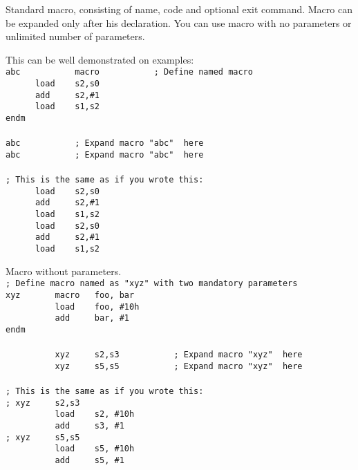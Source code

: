     Standard macro, consisting of name, code and optional exit command. Macro can be expanded only after his declaration. You can use macro with no parameters  or unlimited number of parameters.

    This can be well demonstrated on examples:\\
    {
        \usecodefont
        \verb'abc           macro           ; Define named macro '\\
        \verb'      load    s2,s0'\\
        \verb'      add     s2,#1'\\
        \verb'      load    s1,s2'\\
        \verb'endm'\\\\
        \verb'abc           ; Expand macro "abc"  here'\\
        \verb'abc           ; Expand macro "abc"  here'\\\\
        \verb'; This is the same as if you wrote this:'\\
        \verb'      load    s2,s0'\\
        \verb'      add     s2,#1'\\
        \verb'      load    s1,s2'\\
        \verb'      load    s2,s0'\\
        \verb'      add     s2,#1'\\
        \verb'      load    s1,s2'\\
    }

    Macro without parameters.\\
    {
        \usecodefont
        \verb'; Define macro named as "xyz" with two mandatory parameters'\\
        \verb'xyz       macro   foo, bar'\\
        \verb'          load    foo, #10h'\\
        \verb'          add     bar, #1'\\
        \verb'endm'\\\\
        \verb'          xyz     s2,s3           ; Expand macro "xyz"  here'\\
        \verb'          xyz     s5,s5           ; Expand macro "xyz"  here'\\\\
        \verb'; This is the same as if you wrote this:'\\
        \verb'; xyz     s2,s3'\\
        \verb'          load    s2, #10h'\\
        \verb'          add     s3, #1'\\
        \verb'; xyz     s5,s5'\\
        \verb'          load    s5, #10h'\\
        \verb'          add     s5, #1'\\
    }

